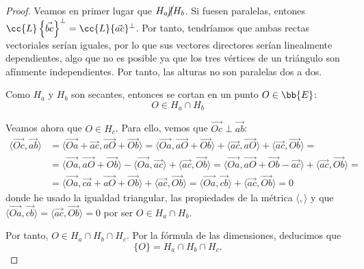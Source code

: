 \begin{proof}
    Veamos en primer lugar que $H_a \cancel{\|} H_b$. Si fuesen paralelas, entones ${\cc{L}\left\{\vec{bc}\right\}^\perp} = {\cc{L}\{\vec{ac}\}^\perp}$. Por tanto, tendríamos que ambas rectas vectoriales serían iguales, por lo que sus vectores directores serían linealmente dependientes, algo que no es posible ya que los tres vértices de un triángulo son afínmente independientes. Por tanto, las alturas no son paralelas dos a dos.

    Como $H_a$ y $H_b$ son secantes, entonces se cortan en un punto $O\in \bb{E}$:
    \begin{equation*}
        O\in H_a\cap H_b
    \end{equation*}

    Veamos ahora que $O\in H_c$. Para ello, vemos que $\vec{Oc}\perp \vec{ab}$:
    \begin{equation*}
        \begin{split}
            \langle \vec{Oc},\vec{ab}\rangle &=
             \langle \vec{Oa} + \vec{ac},\vec{aO}+\vec{Ob}\rangle
             =
             \langle \vec{Oa},\vec{aO}+\vec{Ob}\rangle + \langle\vec{ac},\vec{aO}\rangle + \langle\vec{ac},\vec{Ob}\rangle =\\&
             =
             \langle \vec{Oa},\vec{aO}+\vec{Ob}\rangle -\langle\vec{Oa},\vec{ac}\rangle + \langle\vec{ac},\vec{Ob}\rangle
              =
             \langle \vec{Oa},\vec{aO}+\vec{Ob}-\vec{ac}\rangle + \langle\vec{ac},\vec{Ob}\rangle =\\&
             =
             \langle \vec{Oa},\vec{ca} + \vec{aO}+\vec{Ob}\rangle + \langle\vec{ac},\vec{Ob}\rangle
             =
             \langle \vec{Oa},\vec{cb}\rangle + \langle\vec{ac},\vec{Ob}\rangle = 0
        \end{split}
    \end{equation*}
    donde he usado la igualdad triangular, las propiedades de la métrica $\langle,\rangle$ y que $\langle \vec{Oa},\vec{cb}\rangle = \langle\vec{ac},\vec{Ob}\rangle = 0$ por ser $O\in H_a\cap H_b$.

    Por tanto, $O\in H_a\cap H_b\cap H_c$. Por la fórmula de las dimensiones, deducimos que $$\{O\}=H_a\cap H_b\cap H_c.$$
\end{proof}


